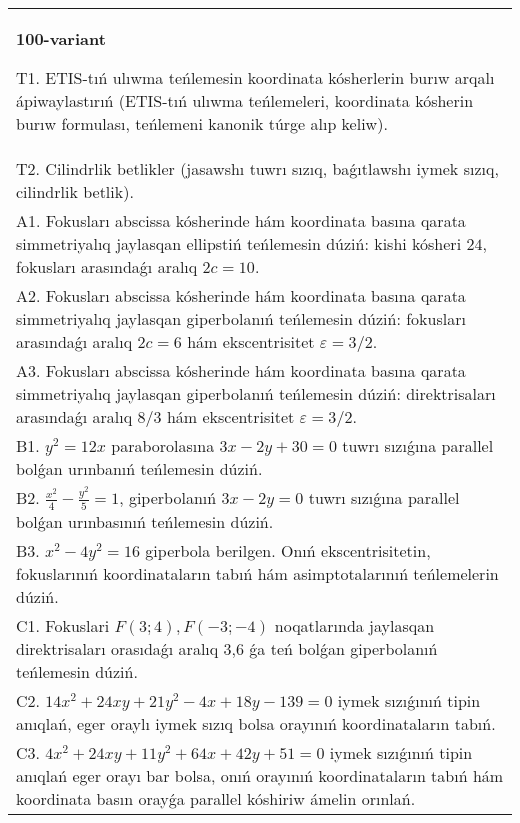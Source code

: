 \documentclass{article}
\begin{document}
\begin{tabular}{m{17cm}}
\textbf{100-variant}
\newline

T1. ETIS-tıń ulıwma teńlemesin koordinata kósherlerin burıw arqalı ápiwaylastırıń (ETIS-tıń ulıwma teńlemeleri, koordinata kósherin burıw formulası, teńlemeni kanonik túrge alıp keliw).\\

T2. Cilindrlik betlikler (jasawshı tuwrı sızıq, baǵıtlawshı iymek sızıq, cilindrlik betlik).\\

A1. Fokusları abscissa kósherinde hám koordinata basına qarata simmetriyalıq jaylasqan ellipstiń teńlemesin dúziń: kishi kósheri $24$, fokusları arasındaǵı aralıq $2 c=10$.\\

A2. Fokusları abscissa kósherinde hám koordinata basına qarata simmetriyalıq jaylasqan giperbolanıń teńlemesin dúziń: fokusları arasındaǵı aralıq $2 c=6$ hám ekscentrisitet $\varepsilon=3/2$.\\

A3. Fokusları abscissa kósherinde hám koordinata basına qarata simmetriyalıq jaylasqan giperbolanıń teńlemesin dúziń: direktrisaları arasındaǵı aralıq $8/3$ hám ekscentrisitet $\varepsilon=3/2$.\\

B1. $y^{2} = 12x$ paraborolasına $3x - 2y + 30 = 0$ tuwrı sızıǵına parallel bolǵan urınbanıń teńlemesin dúziń.  \\

B2. $\frac{x^{2}}{4} - \frac{y^{2}}{5} = 1$, giperbolanıń $3x - 2y = 0$ tuwrı sızıǵına parallel bolǵan urınbasınıń teńlemesin dúziń.  \\

B3. $x^{2} - 4y^{2} = 16$ giperbola berilgen. Onıń ekscentrisitetin, fokuslarınıń koordinataların tabıń hám asimptotalarınıń teńlemelerin dúziń.\\

C1. Fokuslari $F(3;4), F(-3;-4)$ noqatlarında jaylasqan direktrisaları orasıdaǵı aralıq 3,6 ǵa teń bolǵan giperbolanıń teńlemesin dúziń.  \\

C2. $14x^{2} + 24xy + 21y^{2} - 4x + 18y - 139 = 0$ iymek sızıǵınıń tipin anıqlań, eger oraylı iymek sızıq bolsa orayınıń koordinataların tabıń.  \\

C3. $4x^{2} + 24xy + 11y^{2} + 64x + 42y + 51 = 0$ iymek sızıǵınıń tipin anıqlań eger orayı bar bolsa, onıń orayınıń koordinataların tabıń hám koordinata basın orayǵa parallel kóshiriw ámelin orınlań.  \\

\end{tabular}
\vspace{1cm}
\end{document}
